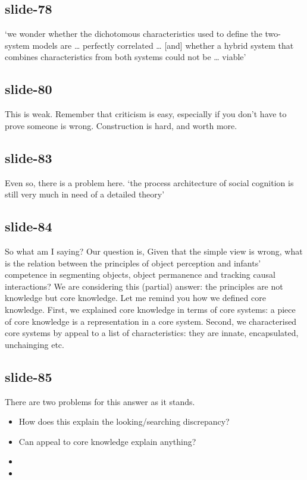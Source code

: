 \documentclass[12pt,\papersize]{extarticle}
\begin{document}
 
\subsection{slide-78}
‘we wonder whether the dichotomous characteristics used to define the two-system models are … perfectly correlated …
[and] whether a hybrid system that combines characteristics from both systems could not be … viable’
\citep[p.\ 537]{keren_two_2009}
 
 
\subsection{slide-80}
This is weak.
Remember that criticism is easy, especially if you don't have to prove someone is wrong.
Construction is hard, and worth more.
 
 
\subsection{slide-83}
Even so, there is a problem here.
‘the process architecture of social cognition is still very much in need of a detailed theory’
\citep[p.\ 759]{adolphs_conceptual_2010}
 
 
\subsection{slide-84}
So what am I saying?
Our question is, Given that the simple view is wrong, what is the relation between the principles of object perception and infants’ competence in segmenting objects, object permanence and tracking causal interactions?
We are considering this (partial) answer: the principles are not knowledge but core knowledge.
Let me remind you how we defined core knowledge.
First, we explained core knowledge in terms of core systems: a piece of core knowledge is a representation in a core system.
Second, we characterised core systems by appeal to a list of characteristics: they are innate, encapsulated, unchainging etc.
 
 
\subsection{slide-85}
There are two problems for this answer as it stands.
\begin{itemize} \item How does this explain the looking/searching discrepancy? \item Can appeal to core knowledge explain anything? \end{itemize}
\begin{itemize}
\item
\item
\end{itemize}
 
\end{document}

